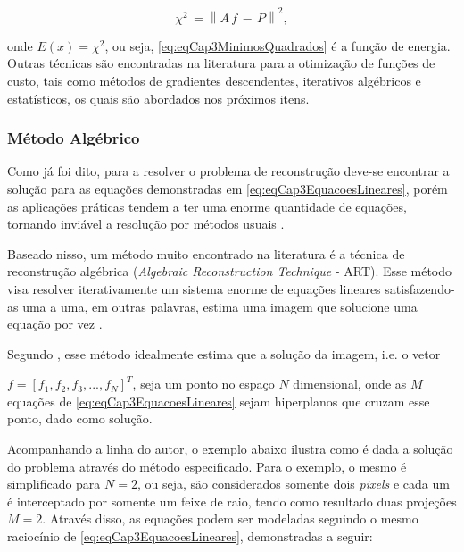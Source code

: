 {\begin{equation}
\chi^{2} \, = \left\| A \, f \, - \,P \right\|^{2},
\label{eq:eqCap3MinimosQuadrados}
\end{equation} 

\noindent onde $E(x) = \chi^{2}$, ou seja, \eqref{eq:eqCap3MinimosQuadrados} é a função de energia. Outras técnicas são encontradas na literatura para a otimização de funções de custo, tais como métodos de gradientes descendentes, iterativos algébricos e estatísticos, os quais são abordados nos próximos itens.


\subsubsection{Método Algébrico}

Como já foi dito, para a resolver o problema de reconstrução deve-se encontrar a solução para as equações demonstradas em \eqref{eq:eqCap3EquacoesLineares}, porém as aplicações práticas tendem a ter uma enorme quantidade de equações, tornando inviável a resolução por métodos usuais \cite[p. 210]{buzug2008computed}. 

Baseado nisso, um método muito encontrado na literatura é a técnica de reconstrução algébrica (\textit{Algebraic Reconstruction Technique} - \acs{ART}). Esse método visa resolver iterativamente um sistema enorme de equações lineares satisfazendo-as uma a uma, em outras palavras, estima uma imagem que solucione uma equação por vez \cite{rangayyan2004biomedical}. 

Segundo , esse método idealmente estima que a solução da imagem, i.e. o vetor {$f = [f_{1},f_{2},f_{3},...,f_{N}]^{T}$, seja um ponto no espaço $N$ dimensional, onde as $M$ equações de \eqref{eq:eqCap3EquacoesLineares} sejam hiperplanos que cruzam esse ponto, dado como solução.

Acompanhando a linha do autor, o exemplo abaixo ilustra como é dada a solução do problema através do método especificado. Para o exemplo, o mesmo é simplificado para $N = 2$, ou seja, são considerados somente dois \textit{pixels} e cada um é interceptado por somente um feixe de raio, tendo como resultado duas projeções $M=2$. Através disso, as equações podem ser modeladas seguindo o mesmo raciocínio de \eqref{eq:eqCap3EquacoesLineares}, demonstradas a seguir:

}}
